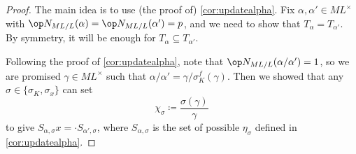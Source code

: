\begin{proof}
	The main idea is to use (the proof of) \autoref{cor:updatealpha}. Fix $\alpha,\alpha'\in ML^\times$ with $\op N_{ML/L}(\alpha)=\op N_{ML/L}(\alpha')=p$, and we need to show that $T_\alpha=T_{\alpha'}$. By symmetry, it will be enough for $T_\alpha\subseteq T_{\alpha'}$.

	Following the proof of \autoref{cor:updatealpha}, note that $\op N_{ML/L}(\alpha/\alpha')=1$, so we are promised $\gamma\in ML^\times$ such that $\alpha/\alpha'=\gamma/\sigma_K^f(\gamma)$. Then we showed that any $\sigma\in\{\sigma_K,\sigma_x\}$ can set
	\[\chi_\sigma\coloneqq\frac{\sigma(\gamma)}\gamma\]
	to give $S_{\alpha,\sigma} x=\cdot S_{\alpha',\sigma}$, where $S_{\alpha,\sigma}$ is the set of possible $\eta_\sigma$ defined in \autoref{cor:updatealpha}.


\end{proof}
